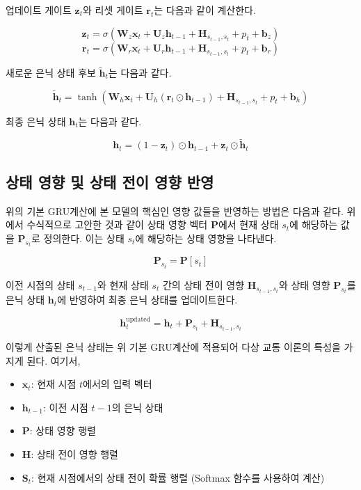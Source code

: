 \documentclass[11pt]{report}
\begin{document}
업데이트 게이트 \( \mathbf{z}_t \)와 리셋 게이트 \( \mathbf{r}_t \)는 다음과 같이 계산한다. 

\[
\mathbf{z}_t = \sigma(\mathbf{W}_z \mathbf{x}_t + \mathbf{U}_z \mathbf{h}_{t-1} + \mathbf{H}_{s_{t-1}, s_t} + p_t + \mathbf{b}_z)
\]
\[
\mathbf{r}_t = \sigma(\mathbf{W}_r \mathbf{x}_t + \mathbf{U}_r \mathbf{h}_{t-1} + \mathbf{H}_{s_{t-1}, s_t} + p_t + \mathbf{b}_r)
\]

새로운 은닉 상태 후보 \( \tilde{\mathbf{h}}_t \)는 다음과 같다. 

\[
\tilde{\mathbf{h}}_t = \tanh(\mathbf{W}_h \mathbf{x}_t + \mathbf{U}_h (\mathbf{r}_t \odot \mathbf{h}_{t-1}) + \mathbf{H}_{s_{t-1}, s_t} + p_t + \mathbf{b}_h)
\]

최종 은닉 상태 \( \mathbf{h}_t \)는 다음과 같다. 

\[
\mathbf{h}_t = (1 - \mathbf{z}_t) \odot \mathbf{h}_{t-1} + \mathbf{z}_t \odot \tilde{\mathbf{h}}_t
\]

\subsection{상태 영향 및 상태 전이 영향 반영}

위의 기본 GRU계산에 본 모델의 핵심인 영향 값들을 반영하는 방법은 다음과 같다. 
위에서 수식적으로 고안한 것과 같이 상태 영향 벡터 \( \mathbf{P} \)에서 현재 상태 \( s_t \)에 해당하는 값을 \( \mathbf{P}_{s_t} \)로 정의한다. 
이는 상태 \( s_t \)에 해당하는 상태 영향을 나타낸다.

\[
\mathbf{P}_{s_t} = \mathbf{P}[s_t]
\]

이전 시점의 상태 \( s_{t-1} \)와 현재 상태 \( s_t \) 간의 상태 전이 영향 \( \mathbf{H}_{s_{t-1}, s_t} \)와 상태 영향 \( \mathbf{P}_{s_t} \)를 은닉 상태 \( \mathbf{h}_t \)에 반영하여 최종 은닉 상태를 업데이트한다.

\[
\mathbf{h}_t^{\text{updated}} = \mathbf{h}_t + \mathbf{P}_{s_t} + \mathbf{H}_{s_{t-1}, s_t}
\]

이렇게 산출된 은닉 상태는 위 기본 GRU계산에 적용되어 다상 교통 이론의 특성을 가지게 된다. 
여기서, 
\begin{itemize}
    \item $\mathbf{x}_t$: 현재 시점 $t$에서의 입력 벡터
    \item $\mathbf{h}_{t-1}$: 이전 시점 $t-1$의 은닉 상태
    \item $\mathbf{P}$: 상태 영향 행렬
    \item $\mathbf{H}$: 상태 전이 영향 행렬
    \item $\mathbf{S}_t$: 현재 시점에서의 상태 전이 확률 행렬 (Softmax 함수를 사용하여 계산)
\end{itemize}
\end{document}
